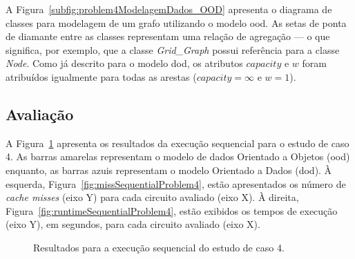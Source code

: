 A Figura~\ref{subfig:problem4ModelagemDados_OOD} apresenta o diagrama de classes para modelagem de um grafo utilizando o modelo \ac{ood}.
As setas de ponta de diamante entre as classes representam  uma relação de agregação --- o que significa, por exemplo, que a classe \textit{Grid\_Graph} possui referência para a classe \textit{Node}.
Como já descrito para o modelo \ac{dod}, os atributos $capacity$ e $w$ foram atribuídos igualmente para todas as arestas ($capacity = \infty$ e $w = 1$).


\subsection{Avaliação}

A Figura~\ref{fig:resultsProblem4sequencial} apresenta os resultados da execução sequencial para o estudo de caso 4.
As barras amarelas representam o modelo de dados Orientado a Objetos (\ac{ood}) enquanto, as barras azuis representam o modelo Orientado a Dados (\ac{dod}).
À esquerda, Figura~\ref{fig:missSequentialProblem4}, estão apresentados os número de  \textit{cache misses} (eixo Y) para cada circuito avaliado (eixo X).
À direita, Figura~\ref{fig:runtimeSequentialProblem4}, estão exibidos os tempos de execução (eixo Y), em segundos, para cada circuito avaliado (eixo X).

\begin{figure}[ht]
    \centering
    \caption{Resultados para a execução sequencial do estudo de caso 4.}
    \label{fig:resultsProblem4sequencial}
\end{figure}

